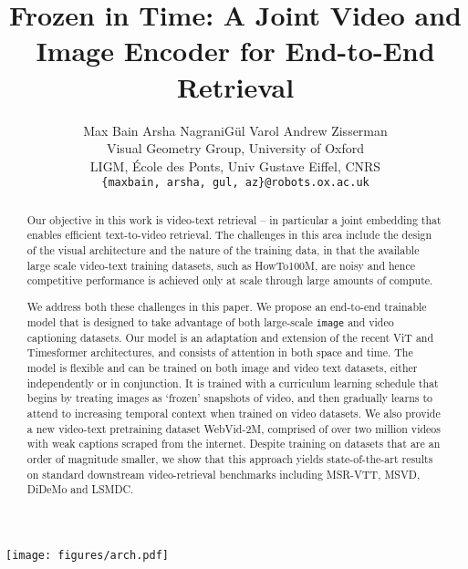 \documentclass[10pt,twocolumn,letterpaper]{article}
\begin{document}
\doparttoc \faketableofcontents 





\title{Frozen in Time: A Joint Video and Image Encoder for End-to-End Retrieval}
\author{Max Bain \quad Arsha Nagrani\footnotemark[2] \quad G\"ul Varol \quad Andrew Zisserman \\
 Visual Geometry Group, University of Oxford \\
 LIGM, \'Ecole des Ponts, Univ Gustave Eiffel, CNRS \\
{\tt\small \{maxbain, arsha, gul, az\}@robots.ox.ac.uk}
}

\maketitle

\noindent
\vspace{-0.5cm}
\begin{strip}
    \centering\noindent
    \texttt{[image: figures/arch.pdf]}
    \label{fig:model}
\end{strip}
\ificcvfinal\thispagestyle{empty}\fi
\renewcommand*{\thefootnote}{\fnsymbol{footnote}}
\renewcommand*{\thefootnote}{\arabic{footnote}}
\begin{abstract}
Our objective in this work is video-text retrieval -- in particular a
joint embedding that enables efficient text-to-video retrieval. The
challenges in this area include the design of the visual architecture
and the nature of the training data, in that the available large scale
video-text training datasets, such as HowTo100M, are noisy and hence competitive performance is achieved only at scale through large amounts of compute.


We address both these challenges in this paper.
We propose an end-to-end trainable model that is
designed to take advantage of both large-scale \texttt{image} and
video captioning datasets. Our model is an adaptation and extension of the 
recent  ViT and Timesformer architectures, and consists of attention in both
space and time. The  model is flexible and can be trained on
both image and video text datasets, either independently or in
conjunction.  It  is trained with a curriculum learning schedule
that begins by treating images as `frozen' snapshots of video, and
then gradually learns to attend to increasing temporal context when
trained on video datasets. We also provide a new video-text pretraining dataset WebVid-2M,
comprised of over two million videos with weak captions scraped from
the internet. Despite training on datasets that are an order of magnitude smaller, 
we show that this approach yields state-of-the-art
results on standard downstream video-retrieval benchmarks including MSR-VTT, MSVD, DiDeMo and LSMDC.


\vspace{-2em}
\end{abstract} 
\end{document}
